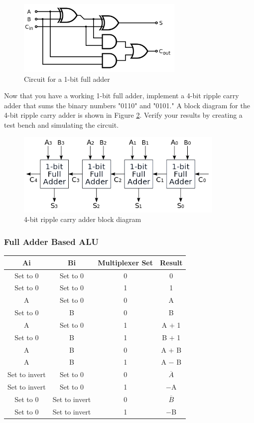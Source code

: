 \begin{figure}[H]
	\centering
	\includegraphics[width=80mm]{Lab3/figures/fulladder.png}
	\caption{Circuit for a 1-bit full adder}
	\label{fig:fulladder}
\end{figure}

Now that you have a working 1-bit full adder, implement a 4-bit ripple carry adder that sums the binary numbers "0110" and "0101." A block diagram for the 4-bit ripple carry adder is shown in Figure \ref{fig:fourbitripple}. Verify your results by creating a test bench and simulating the circuit.

\begin{figure}[H]
	\centering
	\includegraphics[width=100mm]{Lab3/figures/fourbitripple.png}
	\caption{4-bit ripple carry adder block diagram}
	\label{fig:fourbitripple}
\end{figure}

\subsubsection{Full Adder Based ALU}

\begin{tabular}{ | c | c | c | c | }
 	\hline                        
 	 Ai & Bi & Multiplexer Set & Result \\ \hline
 	 Set to 0 & Set to 0 & 0 & 0 \\ \hline
 	 Set to 0 &  Set to 0  & 1 & 1 \\ \hline
 	 A &  Set to 0 & 0 & A \\ \hline
 	 Set to 0& B  & 0  & B  \\ \hline
 	 A & Set to 0 & 1 & A $+$ 1 \\ \hline
 	 Set to 0 & B & 1 & B $+$ 1 \\ \hline
 	 A & B & 0 & A $+$ B \\ \hline
 	 A & B & 1 & A $-$ B \\ \hline
 	 Set to invert & Set to 0 & 0 & $\overline{A}$ \\ \hline
 	 Set to invert & Set to 0 & 1 & $-$A \\ \hline
 	 Set to 0 & Set to invert & 0 &  $\overline{B}$ \\ \hline
 	 Set to 0 & Set to invert & 1 & $-$B \\
 	 \hline
\end{tabular}


